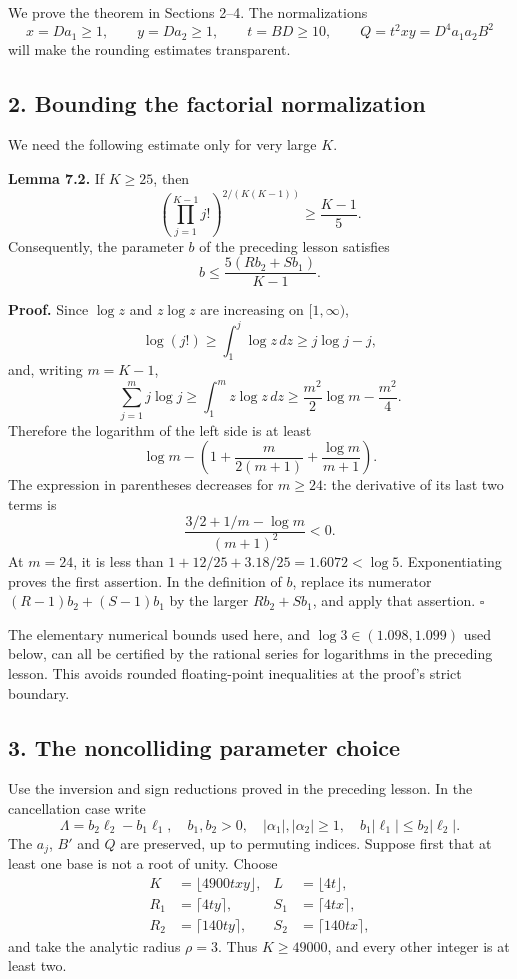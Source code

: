 \documentclass[
  11pt,
  a4paper,
]{article}
\begin{document}
We prove the theorem in Sections 2--4. The normalizations \[
x=Da_1\ge1,\qquad y=Da_2\ge1,\qquad t=BD\ge10,\qquad
Q=t^2xy=D^4a_1a_2B^2 \tag{7.2}
\] will make the rounding estimates transparent.

\subsection{2. Bounding the factorial
normalization}\label{bounding-the-factorial-normalization}

We need the following estimate only for very large \(K\).

\textbf{Lemma 7.2.} If \(K\ge25\), then \[
\left(\prod_{j=1}^{K-1}j!\right)^{2/(K(K-1))}
\ge\frac{K-1}{5}.
\] Consequently, the parameter \(b\) of the preceding lesson satisfies
\[
b\le \frac{5(Rb_2+Sb_1)}{K-1}. \tag{7.3}
\]

\textbf{Proof.} Since \(\log z\) and \(z\log z\) are increasing on
\([1,\infty)\), \[
\log(j!)\ge\int_1^j\log z\,dz\ge j\log j-j,
\] and, writing \(m=K-1\), \[
\sum_{j=1}^{m}j\log j
\ge\int_1^m z\log z\,dz
\ge\frac{m^2}{2}\log m-\frac{m^2}{4}.
\] Therefore the logarithm of the left side is at least \[
\log m-
\left(1+\frac{m}{2(m+1)}+\frac{\log m}{m+1}\right).
\] The expression in parentheses decreases for \(m\ge24\): the
derivative of its last two terms is \[
\frac{3/2+1/m-\log m}{(m+1)^2}<0.
\] At \(m=24\), it is less than \(1+12/25+3.18/25=1.6072<\log5\).
Exponentiating proves the first assertion. In the definition of \(b\),
replace its numerator \((R-1)b_2+(S-1)b_1\) by the larger \(Rb_2+Sb_1\),
and apply that assertion. \(\square\)

The elementary numerical bounds used here, and \(\log3\in(1.098,1.099)\)
used below, can all be certified by the rational series for logarithms
in the preceding lesson. This avoids rounded floating-point inequalities
at the proof's strict boundary.

\subsection{3. The noncolliding parameter
choice}\label{the-noncolliding-parameter-choice}

Use the inversion and sign reductions proved in the preceding lesson. In
the cancellation case write \[
\Lambda=b_2\ell_2-b_1\ell_1,\quad b_1,b_2>0,\quad
|\alpha_1|,|\alpha_2|\ge1,\quad b_1|\ell_1|\le b_2|\ell_2|.
\] The \(a_j\), \(B'\) and \(Q\) are preserved, up to permuting indices.
Suppose first that at least one base is not a root of unity. Choose \[
\begin{aligned}
K&=\lfloor4900txy\rfloor,&L&=\lfloor4t\rfloor,\\
R_1&=\lceil4ty\rceil,&S_1&=\lceil4tx\rceil,\\
R_2&=\lceil140ty\rceil,&S_2&=\lceil140tx\rceil,
\end{aligned} \tag{7.4}
\] and take the analytic radius \(\rho=3\). Thus \(K\ge49000\), and
every other integer is at least two.
\end{document}
